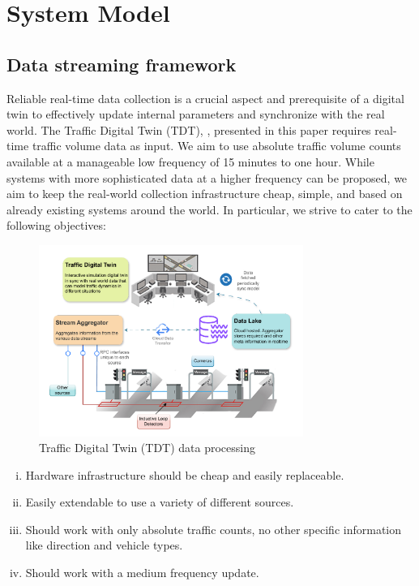 \section{System Model}\label{sec:system-model}
\subsection{\textbf{Data streaming framework}}

Reliable real-time data collection is a crucial aspect and prerequisite of a digital twin to effectively update internal parameters and synchronize with the real world. The Traffic Digital Twin (TDT), \name, presented in this paper requires real-time traffic volume data as input. We aim to use absolute traffic volume counts available at a manageable low frequency of 15 minutes to one hour. While systems with more sophisticated data at a higher frequency can be proposed, we aim to keep the real-world collection infrastructure cheap, simple, and based on already existing systems around the world. In particular, we strive to cater to the following objectives:

\begin{figure}[t]
  \centering
  \includegraphics[width=0.77\textwidth]{framework.pdf} %
  \caption{Traffic Digital Twin (TDT) data processing}
  \label{fig:framework}
\end{figure}

\begin{enumerate}[(i)]
    \item Hardware infrastructure should be cheap and easily replaceable.
    \item Easily extendable to use a variety of different sources.
    \item Should work with only absolute traffic counts, no other specific information like direction and vehicle types.
    \item Should work with a medium frequency update.
\end{enumerate}

